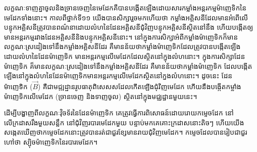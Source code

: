 លក្ខណៈទាញគ្នាចូលនិងច្រានចេញនៃមេដែកគឺបានបង្កើតឡើងដោយសារកម្លាំងអន្តរកម្មម៉ាញេទិកនៃមេដែកទាំងនោះ។ កាលពីថ្នាក់ទី១១ យើងបានសិក្សារួចមកហើយថា កម្លាំងអគ្គិសនីដែលមានអំពើលើបន្ទុកអគ្គិសនីត្រូវបានពណ៌នាដោយលំហនៃដែនអគ្គិសនីជុំវិញបន្ទុកអគ្គិសនីស្ថិតនៅនឹង ហើយបង្កើតឲ្យមានអន្តរកម្មរវាងដែនអគ្គិសនីនិងបន្ទុកអគ្គិសនីនោះ។ នៅក្នុងការសិក្សាអំពីកម្លាំងម៉ាញេទិកក៏មានលក្ខណៈស្រដៀងទៅនឹងកម្លាំងអគ្គិសនីដែរ គឺមានន័យថាកម្លាំងម៉ាញេទិកដែលត្រូវបានបង្កើតឡើងដោយលំហនៃដែនម៉ាញេទិក មានអន្តរកម្មលើមេដែកដែលស្ថិតនៅក្នុងលំហនោះ។ ក្នុងការសិក្សាដែនម៉ាញេទិក គ៏មានលក្ខណៈស្រដៀងទៅនឹងកម្លាំងអគ្គិសនីដែរ គឺមានន័យថាកម្លាំងម៉ាញេទិក ដែលបង្កើតឡើងនៅក្នុងលំហនៃដែនម៉ាញេទិកមានអន្តរកម្មលើមេដែកស្ថិតនៅក្នងលំហនោះ។ ដូចនេះ ដែនម៉ាញេទិក ($\vec{B}$) គឺជាមជ្ឍដ្ឋានរូបធាតុពិសេសសដែលកើតឡើងជុំវិញមេដែក ហើយនឹងបង្កើតកម្លាំងម៉ាញេទិកលើមេដែក (ច្រានចេញ និងទាញចូល) ស្ថិតនៅក្នុងមជ្ឈដ្ឋានមួយនេះ។\\

\noindent
\begin{minipage}[t]{0.55\textwidth}
	\raggedright
ដើម្បីបង្ហាញពីលក្ខណៈវ៉ិចទ័រនៃដែនម៉ាញេទិក
គេត្រូវធ្វើការពិសោធន៍ដោយរោយកម្ទេចដែក
នៅលើក្រដាសរឹងមួយសន្លឹក នៅជុំវិញរបារមេដែកមួយ
បន្ទាប់មកគេគោះក្រដាសនោះតិចៗ
ហើយយើងសង្កេតឃើញថាកម្ទេចដែកនោះត្រូវបានរត់ជាជួរខ្សែមានរាយជុំវិញមេដែក។ កម្ទេចដែលបានរៀបជាជួរហៅថា ស្បុិចម៉ាញេទិកនៃរបារមេដែក។\\
\end{minipage}%
\hfill
\begin{minipage}[t]{0.45\textwidth}
	\vspace{0pt}
\end{minipage}

